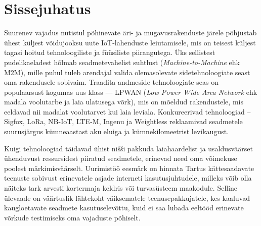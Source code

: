 \documentclass[12pt]{article}
\newcommand{\TODO}{\todo[inline]}
\begin{document}
    {\EngInfo}{\EstInfo}


    \newpage
    \setlength{\parskip}{0em}
    \tableofcontents
    \setlength{\parskip}{1em}



    \newpage


    \section{Sissejuhatus}


    Suurenev vajadus nutistul põhinevate äri- ja mugavusrakenduste järele põhjustab ühest küljest võidujooksu uute IoT-lahenduste leiutamisele, mis on teisest küljest tagasi hoitud tehnoloogiliste ja füüsiliste piirangutega.
    Üks sellistest pudelikaeladest hõlmab seadmetevahelist suhtlust (\textit{Machine-to-Machine} ehk M2M), mille puhul tuleb arendajal valida olemasolevate sidetehnoloogiate seast oma rakendusele sobivaim.
    Traadita andmeside tehnoloogiate seas on populaarsust kogumas uus klass — LPWAN (\textit{Low Power Wide Area Network} ehk madala voolutarbe ja laia ulatusega võrk), mis on mõeldud rakendustele, mis eeldavad nii madalat voolutarvet kui laia leviala.
    Konkureerivad tehnoloogiad -- Sigfox, LoRa, NB-IoT, LTE-M, Ingenu ja Weightless reklaamivad seadmetele suurusjärgus kümneaastast aku eluiga ja kümnekilomeetrist levikaugust.

    Kuigi tehnoloogiad täidavad ühist nišši pakkuda laiahaardelist ja usaldusväärset ühenduvust ressursidest piiratud seadmetele, erinevad need oma võimekuse poolest märkimisväärselt.
    Uurimistöö eesmärk on hinnata Tartus kättesaadavate teenuste sobivust erinevatele asjade interneti kasutusjuhtudele, milleks võib olla näiteks tark arvesti kortermaja keldris või turvasüsteem maakodule.
    Selline ülevaade on väärtuslik lähtekoht väiksematele teenusepakkujatele, kes kaaluvad kaugloetavate seadmete kasutuselevõttu, kuid ei saa lubada eeltööd erinevate võrkude testimiseks oma vajaduste põhiselt.
\end{document}
